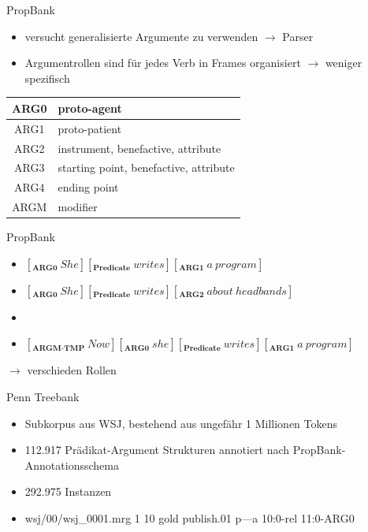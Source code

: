 \documentclass[10pt]{beamer}
\begin{document}
\begin{frame}{PropBank}
  \begin{itemize}
   \item versucht generalisierte Argumente zu verwenden $\rightarrow$ Parser
   \item Argumentrollen sind für jedes Verb in Frames organisiert $\rightarrow$ weniger spezifisch
  \end{itemize}
  
	\begin{table}
	\centering
	\begin{tabular}{|c|l|}
	\hline 
	ARG0 & proto-agent \\ 
	\hline 
	ARG1 & proto-patient \\ 
	\hline 
	ARG2 & instrument, benefactive, attribute \\ 
	\hline 
	ARG3 & starting point, benefactive, attribute \\ 
	\hline 
	ARG4 & ending point \\ 
	\hline 
	ARGM & modifier \\ 
	\hline 
	\end{tabular}
	\end{table}

\end{frame}

\begin{frame}{PropBank}
	
	\begin{itemize}
		
		\item $ [_{\textbf{ARG0}}\ She][_{\textbf{Predicate}}\ writes][_{\textbf{ARG1}}\ a\ program] $ 
		\item $ [_{\textbf{ARG0}}\ She][_{\textbf{Predicate}}\ writes][_{\textbf{ARG2}}\ about\ headbands] $
		\item {}
		\item $ [_{\textbf{ARGM-TMP}}\ Now][_{\textbf{ARG0}}\ she][_{\textbf{Predicate}}\ writes][_{\textbf{ARG1}}\ a\ program] $ 
		\end{itemize}
		\hspace{10pt} $ \rightarrow $ verschieden Rollen
		
	
\end{frame}


\begin{frame}{Penn Treebank}
  \begin{itemize}
   \item Subkorpus aus WSJ, bestehend aus ungefähr 1 Millionen Tokens
   \item 112.917 Prädikat-Argument Strukturen annotiert nach PropBank-Annotationsschema
   \item 292.975 Instanzen
   \item \footnotesize{ wsj/00/wsj\_0001.mrg 1 10 gold publish.01 p---a 10:0-rel 11:0-ARG0}
          
  \end{itemize}
  
\end{frame}
\end{document}
